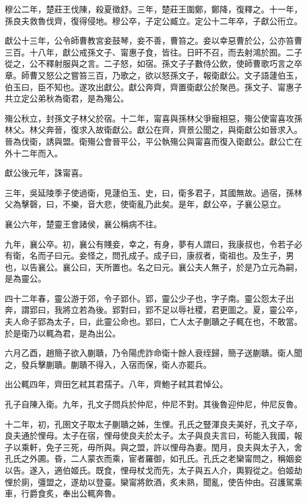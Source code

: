 穆公二年，楚莊王伐陳，殺夏徵舒。三年，楚莊王圍鄭，鄭降，復釋之。十一年，孫良夫救魯伐齊，復得侵地。穆公卒，子定公臧立。定公十二年卒，子獻公衎立。

獻公十三年，公令師曹教宮妾鼓琴，妾不善，曹笞之。妾以幸惡曹於公，公亦笞曹三百。十八年，獻公戒孫文子、甯惠子食，皆往。日旰不召，而去射鴻於囿。二子從之，公不釋射服與之言。二子怒，如宿。孫文子子數侍公飲，使師曹歌巧言之卒章。師曹又怒公之嘗笞三百，乃歌之，欲以怒孫文子，報衛獻公。文子語蘧伯玉，伯玉曰，臣不知也。遂攻出獻公。獻公奔齊，齊置衛獻公於聚邑。孫文子、甯惠子共立定公弟秋為衛君，是為殤公。

殤公秋立，封孫文子林父於宿。十二年，甯喜與孫林父爭寵相惡，殤公使甯喜攻孫林父。林父奔晉，復求入故衛獻公。獻公在齊，齊景公聞之，與衛獻公如晉求入。晉為伐衛，誘與盟。衛殤公會晉平公，平公執殤公與甯喜而復入衛獻公。獻公亡在外十二年而入。

獻公後元年，誅甯喜。

三年，吳延陵季子使過衛，見蘧伯玉、史，曰，衛多君子，其國無故。過宿，孫林父為擊磬，曰，不樂，音大悲，使衛亂乃此矣。是年，獻公卒，子襄公惡立。

襄公六年，楚靈王會諸侯，襄公稱病不往。

九年，襄公卒。初，襄公有賤妾，幸之，有身，夢有人謂曰，我康叔也，令若子必有衛，名而子曰元。妾怪之，問孔成子。成子曰，康叔者，衛祖也。及生子，男也，以告襄公。襄公曰，天所置也。名之曰元。襄公夫人無子，於是乃立元為嗣，是為靈公。

四十二年春，靈公游于郊，令子郢仆。郢，靈公少子也，字子南。靈公怨太子出奔，謂郢曰，我將立若為後。郢對曰，郢不足以辱社稷，君更圖之。夏，靈公卒，夫人命子郢為太子，曰，此靈公命也。郢曰，亡人太子蒯聵之子輒在也，不敢當。於是衛乃以輒為君，是為出公。

六月乙酉，趙簡子欲入蒯聵，乃令陽虎詐命衛十餘人衰绖歸，簡子送蒯聵。衛人聞之，發兵擊蒯聵。蒯聵不得入，入宿而保，衛人亦罷兵。

出公輒四年，齊田乞弒其君孺子。八年，齊鮑子弒其君悼公。

孔子自陳入衛。九年，孔文子問兵於仲尼，仲尼不對。其後魯迎仲尼，仲尼反魯。

十二年，初，孔圉文子取太子蒯聵之姊，生悝。孔氏之豎渾良夫美好，孔文子卒，良夫通於悝母。太子在宿，悝母使良夫於太子。太子與良夫言曰，茍能入我國，報子以乘軒，免子三死，毋所與。與之盟，許以悝母為妻。閏月，良夫與太子入，舍孔氏之外圃。昏，二人蒙衣而乘，宦者羅御，如孔氏。孔氏之老欒甯問之，稱姻妾以告。遂入，適伯姬氏。既食，悝母杖戈而先，太子與五人介，輿猳從之。伯姬劫悝於廁，彊盟之，遂劫以登臺。欒甯將飲酒，炙未熟，聞亂，使告仲由。召護駕乘車，行爵食炙，奉出公輒奔魯。

